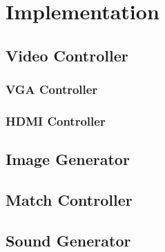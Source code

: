 \newpage
\section{Implementation}
	\subsection{Video Controller}
        \subsubsection{VGA Controller}
        \subsubsection{HDMI Controller}
    \subsection{Image Generator}
    \subsection{Match Controller}
    \subsection{Sound Generator}
